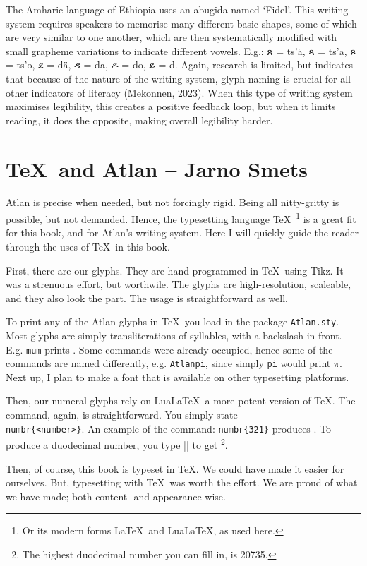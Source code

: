 The Amharic language of Ethiopia uses an abugida named ‘Fidel’. This writing system requires speakers to memorise many different basic shapes, some of which are very similar to one another, which are then systematically modified with small grapheme variations to indicate different vowels. E.g.: ጸ = ts’\"{a}, ጻ = ts’a, ጾ = ts’o, ደ = d\"{a}, ዳ = da, ዶ = do, ይ = d. Again, research is limited, but indicates that because of the nature of the writing system, glyph-naming is crucial for all other indicators of literacy (Mekonnen, 2023). When this type of writing system maximises legibility, this creates a positive feedback loop, but when it limits reading, it does the opposite, making overall legibility harder.  

\section{\TeX\ and Atlan -- {\small Jarno Smets}}
Atlan is precise when needed, but not forcingly rigid. Being all nitty-gritty is possible, but not demanded. Hence, the typesetting language \TeX\ \footnote{Or its modern forms \LaTeX\ and Lua\LaTeX, as used here.} is a great fit for this book, and for Atlan's writing system. Here I will quickly guide the reader through the uses of \TeX\ in this book.

First, there are our glyphs. They are hand-programmed in \TeX\ using Tikz. It was a strenuous effort, but worthwile. The glyphs are high-resolution, scaleable, and they also look the part. The usage is straightforward as well. 

To print any of the Atlan glyphs in \TeX\, you load in the package {\tt Atlan.sty}. Most glyphs are simply transliterations of syllables, with a backslash in front. E.g. \texttt{mum} prints \mum. Some commands were already occupied, hence some of the commands are named differently, e.g. \texttt{Atlanpi}, since simply \texttt{pi} would print $\pi$. Next up, I plan to make a font that is available on other typesetting platforms. 

Then, our numeral glyphs rely on Lua\LaTeX\, a more potent version of \TeX. The command, again, is straightforward. You simply state \texttt{\\numbr\{<number>\footnotemark\}}.   An example of the command: \texttt{numbr\{321\}} produces . To produce a duodecimal number, you type \verba|| to get \footnote{The highest duodecimal number you can fill in, is 20735.}. 



Then, of course, this book is typeset in \TeX . We could have made it easier for ourselves. But, typesetting with \TeX\ was worth the effort. We are proud of what we have made; both content- and appearance-wise.    


\vfill
